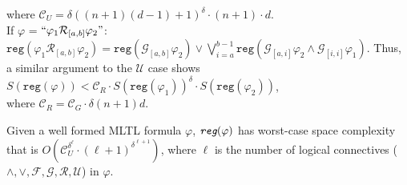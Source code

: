 \documentclass[runningheads]{llncs}
\renewcommand{\phi}{\varphi}
\begin{document}
\begin{flushleft}
    where $\mathcal{C}_U = \delta ((n+1)(d-1) + 1)^\delta \cdot (n+1) \cdot d$.\\
\hspace{3mm} If $\phi$ = $``\phi_1 \mathcal{R}_{[a, b]} \phi_2"$:
    $\texttt{reg}(\phi_1 \mathcal{R}_{[a,b]} \phi_2) =  \texttt{reg}\left(\mathcal{G}_{[a,b]}\phi_2\right) \lor \bigvee_{i=a}^{b-1} \texttt{reg}\left(\mathcal{G}_{[a,i]}\phi_2 \land \mathcal{G}_{[i, i]} \phi_1\right)$. Thus, a similar argument to the $\mathcal{U}$ case shows
    $S(\texttt{reg}(\phi)) < \mathcal{C}_R \cdot S(\texttt{reg}(\phi_1))^\delta \cdot S(\texttt{reg}(\phi_2))$, \\
    where $\mathcal{C}_R = \mathcal{C}_G \cdot \delta (n+1)d$.
\end{flushleft}
\begin{theorem}
Given a well formed MLTL formula $\phi$, $\emph{\texttt{reg}}(\phi)$ has worst-case space complexity that is $O(\mathcal{C}_U^{\delta ^ \ell} \cdot (\ell + 1)^{\delta^{\ell + 1}})$, where $\ell$ is the number of logical connectives ($\land, \lor, \mathcal{F}, \mathcal{G}, \mathcal{R}, \mathcal{U}$) in $\phi$. 
\end{theorem}
\end{document}
